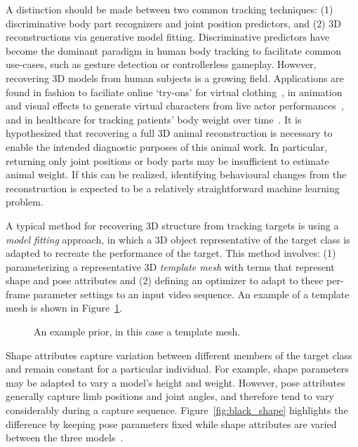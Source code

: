     A distinction should be made between two common tracking techniques: (1) discriminative body part recognizers and joint position predictors, and (2) 3D reconstructions via generative model fitting. Discriminative predictors have become the dominant paradigm in human body tracking to facilitate common use-cases, such as gesture detection or controllerless gameplay. However, recovering 3D models from human subjects is a growing field. Applications are found in fashion to faciliate online `try-ons' for virtual clothing~\cite{lin2014digital}, in animation and visual effects to generate virtual characters from live actor performances~\cite{laine2017production}, and in healthcare for tracking patients' body weight over time~\cite{velardo2010weight}. It is hypothesized that recovering a full 3D animal reconstruction is necessary to enable the intended diagnostic purposes of this animal work. In particular, returning only joint positions or body parts may be insufficient to estimate animal weight. If this can be realized, identifying behavioural changes from the reconstruction is expected to be a relatively straightforward machine learning problem. 

    A typical method for recovering 3D structure from tracking targets is using a \emph{model fitting} approach, in which a 3D object representative of the target class is adapted to recreate the performance of the target. This method involves: (1) parameterizing a representative 3D \emph{template mesh} with terms that represent shape and pose attributes and (2) defining an optimizer to adapt to these per-frame parameter settings to an input video sequence. An example of a template mesh is shown in Figure~\ref{fig:arap_template}.
    
    \begin{figure}[H] %
        \caption{An example prior, in this case a template mesh.}
        \label{fig:arap_template}
    \end{figure}

    Shape attributes capture variation between different members of the target class and remain constant for a particular individual. For example, shape parameters may be adapted to vary a model's height and weight. However, pose attributes generally capture limb positions and joint angles, and therefore tend to vary considerably during a capture sequence. Figure~\ref{fig:black_shape} highlights the difference by keeping pose parameters fixed while shape attributes are varied between the three models~\cite{Streuber:SIGGRAPH:2016}.

